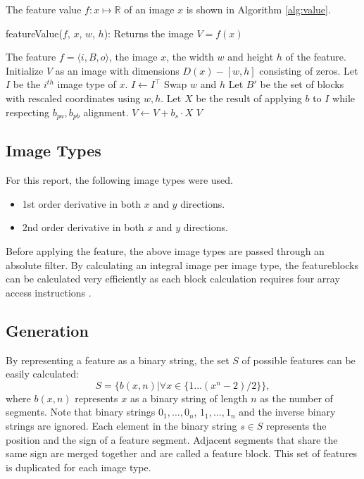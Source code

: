 \documentclass[a4paper,11pt]{article}
\begin{document}
The feature value $f:x\mapsto\mathbb{R}$ of an image $x$ is shown in Algorithm
\ref{alg:value}.
\begin{algorithm}[!ht]
	\caption{featureValue($f$, $x$, $w$, $h$): Returns the image $V = f(x)$}
	\begin{algorithmic}[1]
	\REQUIRE The feature $f = \langle i, B, o \rangle$, the image $x$, the width $w$ and height $h$ of the feature.
	\medskip
	\STATE Initialize $V$ as an image with dimensions $D(x)-[w, h]$ consisting of zeros.
	\STATE Let $I$ be the $i^{th}$ image type of $x$.
		\STATE $I \leftarrow I^\top$
		\STATE Swap $w$ and $h$
	\ENDIF
	\STATE Let $B'$ be the set of blocks with rescaled coordinates using $w,h$.
		\STATE Let $X$ be the result of applying $b$ to $I$ while respecting $b_{pa}, b_{pb}$ alignment.
		\STATE $V \leftarrow V + b_s \cdot X$
	\ENDFOR
	\RETURN $V$
	\end{algorithmic}
\label{alg:value}
\end{algorithm}

\newpage
\subsection{Image Types} \label{sec:image}
For this report, the following image types were used.
\begin{itemize}
	\item{1st order derivative in both $x$ and $y$ directions.}
	\item{2nd order derivative in both $x$ and $y$ directions.}
\end{itemize}
Before applying the feature, the above image types are passed through an
absolute filter. By calculating an integral image per image type, the
featureblocks can be calculated very efficiently as each block calculation
requires four array access instructions \cite{viola}.

\subsection{Generation} \label{sec:gen}
By representing a feature as a binary string, the set $S$ of possible features
can be easily calculated:
$$S = \{b(x,n) | \forall x \in \{1\ldots(x^n-2)/2\}\},$$
where $b(x,n)$ represents $x$ as a binary string of length $n$ as the number of
segments. Note that binary strings $0_1,\ldots,0_n$, $1_1,\ldots,1_n$ and the
inverse binary strings are ignored. Each element in the binary string $s \in S$
represents the position and the sign of a feature segment. Adjacent segments
that share the same sign are merged together and are called a feature block.
This set of features is duplicated for each image type.
\end{document}
